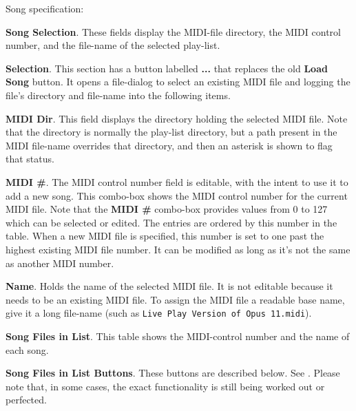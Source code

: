    Song specification:

   \begin{enumber}
      \item \textbf{Song Selection}.
         These fields display the MIDI-file directory,
         the MIDI control number, and the file-name of the selected play-list.
         \begin{enumber}
            \item \textbf{Selection}.
               This section has a button labelled \textbf{...} that
               replaces the old \textbf{Load Song} button.
               It opens a file-dialog to select an existing MIDI
               file and logging the file's directory and file-name
               into the following items.
            \item \textbf{MIDI Dir}.
               This field displays the directory holding the selected
               MIDI file.
               Note that the directory is normally the play-list directory,
               but a path present in the MIDI file-name overrides that
               directory, and then an asterisk is shown to flag that status.
            \item \textbf{MIDI \#}.
               The MIDI control number field is editable,
               with the intent to use it to add a new song.
               This combo-box shows the MIDI control number for the current
               MIDI file.
               Note that the \textbf{MIDI \#} combo-box provides values from
               0 to 127 which can be selected or edited.
               The entries are ordered by this number in the table.
               When a new MIDI file is specified, this number is
               set to one past the highest existing MIDI file number.
               It can be modified as long as it's not the same as
               another MIDI number.
            \item \textbf{Name}.  
               Holds the name of the selected MIDI file.
               It is not editable because it needs to be an existing MIDI
               file.
               To assign the MIDI file a readable base name, give it a
               long file-name
               (such as \texttt{Live Play Version of Opus 11.midi}).
         \end{enumber}
      \item \textbf{Song Files in List}.
         This table shows the MIDI-control number and
         the name of each song.
      \item \textbf{Song Files in List Buttons}.
         These buttons are described below.
         See .
         Please note that, in some cases, the exact functionality is still
         being worked out or perfected.
   \end{enumber}

